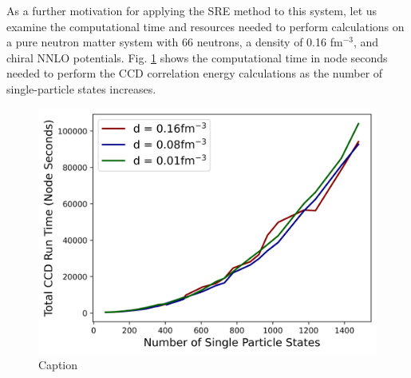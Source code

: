 As a further motivation for applying the SRE method to this system, let us examine the computational time and resources needed to perform calculations on a pure neutron matter system with 66 neutrons, a density of 0.16 fm$^{-3}$, and chiral NNLO potentials. Fig. \ref{fig:nnlo_ccd_times} shows the computational time in node seconds needed to perform the CCD correlation energy calculations as the number of single-particle states increases.

\begin{figure}
    \centering
    \includegraphics{Images/Chapter7/ORNL/pnm_times.png}
    \caption{Caption}
    \label{fig:nnlo_ccd_times}
\end{figure}


